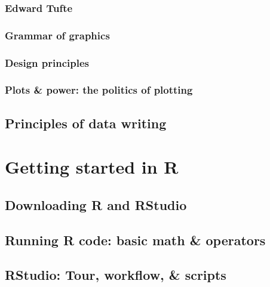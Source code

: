 \documentclass[
]{book}
\begin{document}
\hypertarget{edward-tufte}{%
\subsection{Edward Tufte}\label{edward-tufte}}

\hypertarget{grammar-of-graphics}{%
\subsection{Grammar of graphics}\label{grammar-of-graphics}}

\hypertarget{design-principles}{%
\subsection{Design principles}\label{design-principles}}

\hypertarget{plots-power-the-politics-of-plotting}{%
\subsection{Plots \& power: the politics of plotting}\label{plots-power-the-politics-of-plotting}}

\hypertarget{principles-of-data-writing}{%
\section{Principles of data writing}\label{principles-of-data-writing}}

\hypertarget{getting-started-in-r}{%
\chapter{Getting started in R}\label{getting-started-in-r}}

\hypertarget{downloading-r-and-rstudio}{%
\section{Downloading R and RStudio}\label{downloading-r-and-rstudio}}

\hypertarget{running-r-code-basic-math-operators}{%
\section{Running R code: basic math \& operators}\label{running-r-code-basic-math-operators}}

\hypertarget{rstudio-tour-workflow-scripts}{%
\section{RStudio: Tour, workflow, \& scripts}\label{rstudio-tour-workflow-scripts}}
\end{document}
